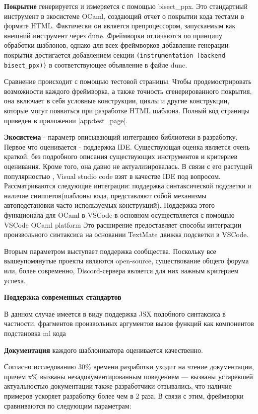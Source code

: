 \textbf{Покрытие} генерируется и измеряется с помощью bisect\_ppx.
Это стандартный инструмент в экосистеме OCaml, создающий отчет о покрытии кода тестами в формате HTML.
Фактически он является препроцессором, запускаемым как внешний инструмент через dune.
Фреймворки отличаются по принципу обработки шаблонов, однако для всех фреймворков добавление генерации покрытия достигается добавлением секции \texttt{(instrumentation (backend bisect\_ppx))} в соответствующее объявление в файле dune.

Сравнение происходит с помощью тестовой страницы.
Чтобы продемострировать возможности каждого фреймворка, а также точность сгенерированного покрытия, она включает в себя условные конструкции, циклы и другие конструкции, которые могут появиться при разработке HTML шаблона.
Полный код страницы приведен в приложении \ref{app:test_page}.

\textbf{Экосистема} - параметр описывающий интеграцию библиотеки в разработку.
Первое что оценивается - поддержка IDE.
Существующая оценка является очень краткой, без подробного описания существующих инструментов и критериев оценивания.
Кроме того, она давно не актуализировалась.
В связи с его растущей популярностью \cite{VSCode2025}, Visual studio code взят в качестве IDE под вопросом.
Рассматриваются следующие интеграции: поддержка синтаксической подсветки и наличие сниппетов(шаблоны кода, представляют собой механизмы автоподстановки часто используемых конструкций).
Поддержка этого функционала для OCaml в VSCode в основном осуществляется с помощью VSCode OCaml platform %
Это расширение предоставляет способы интеграции произвольного синтаксиса на основании TextMate движка подсветки в VSCode.

Вторым параметром выступает поддержка сообщества.
Поскольку все вышеупомянутые проекты являются open-source, существование общего форума или, более современно, Discord-сервера является для них важным критерием успеха.

\textbf{Поддержка современных стандартов}

В данном случае имеется в виду поддержка JSX подобного синтаксиса
в частности, фрагментов
произвольных аргументов
вызов функций как компонентов
подстановка ml кода


\textbf{Документация} каждого шаблонизатора оценивается качественно.

Согласно исследованию %
30\% времени разработки уходит на чтение документации, причем 
x\% вызваны незадокументированным поведением
--- вызваны устаревшей актуальностью документации
также разработчики %
отзывались, что наличие примеров ускоряет разработку более чем в 2 раза.
В связи с этим, фреймворки сравниваются по следующим параметрам:

